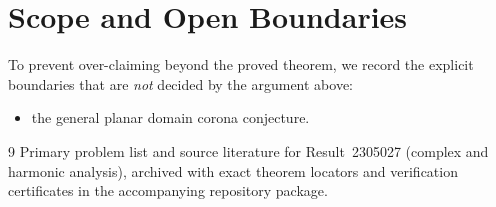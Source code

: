 \documentclass[10pt,reqno]{amsart}
\theoremstyle{definition}
\begin{document}
\section{Scope and Open Boundaries}

To prevent over-claiming beyond the proved theorem, we record the explicit boundaries that are \emph{not} decided by the argument above:
\begin{itemize}
  \item the general planar domain corona conjecture.
\end{itemize}

\begin{thebibliography}{9}
Primary problem list and source literature for Result~2305027 (complex and harmonic analysis), archived with exact theorem locators and verification certificates in the accompanying repository package.
\end{thebibliography}
\end{document}
